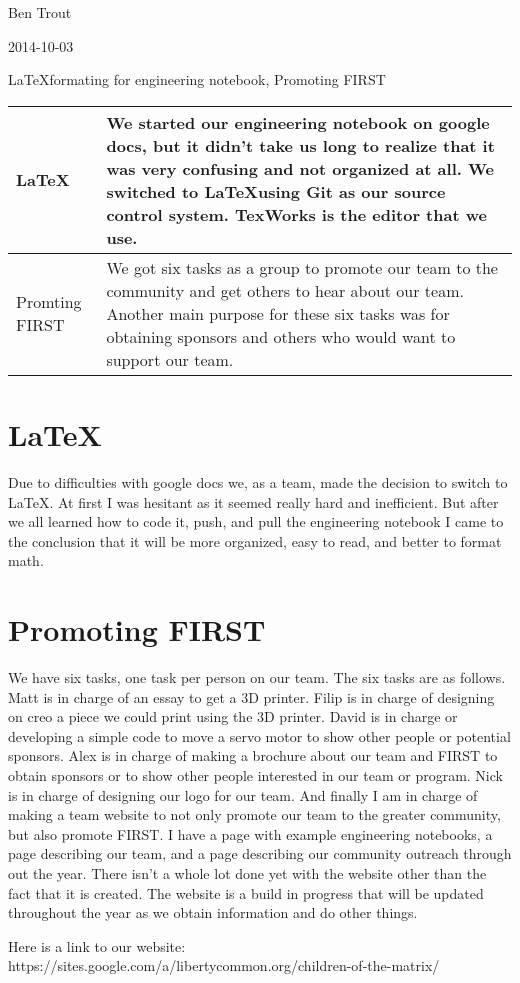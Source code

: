 Ben Trout

2014-10-03

\LaTeX formating for engineering notebook, Promoting FIRST

\begin{tabular}{|p{5cm}|p{5cm}|}
 \hline
 \LaTeX&
 We started our engineering notebook on google docs, but it didn't take us long to realize that it was very confusing and not organized at all. We switched to \LaTeX using Git as our source control system. TexWorks is the editor that we use. 
 \\ 
 \hline
 Promting FIRST&
 We got six tasks as a group to promote our team to the community and get others to hear about our team. Another main purpose for   these six tasks was for obtaining sponsors and others who would want to support our team. 
 \\
 \hline
\end{tabular} 

\section*{\LaTeX}
Due to difficulties with google docs we, as a team, made the decision to switch to \LaTeX. At first I was hesitant as it seemed really hard and inefficient. But after we all learned how to code it, push, and pull the engineering notebook I came to the conclusion that it will be more organized, easy to read, and better to format math. 

\section* {Promoting FIRST}
We have six tasks, one task per person on our team. The six tasks are as follows. Matt is in charge of an essay to get a 3D printer. Filip is in charge of designing on creo a piece we could print using the 3D printer. David is in charge or developing a simple code to move a servo motor to show other people or potential sponsors. Alex is in charge of making a brochure about our team and FIRST to obtain sponsors or to show other people interested in our team or program. Nick is in charge of designing our logo for our team. And finally I am in charge of making a team website to not only promote our team to the greater community, but also promote FIRST. I have a page with example engineering notebooks, a page describing our team, and a page describing our community outreach through out the year. There isn't a whole lot done yet with the website other than the fact that it is created. The website is a build in progress that will be updated throughout the year as we obtain information and do other things. 

Here is a link to our website: https://sites.google.com/a/libertycommon.org/children-of-the-matrix/
  